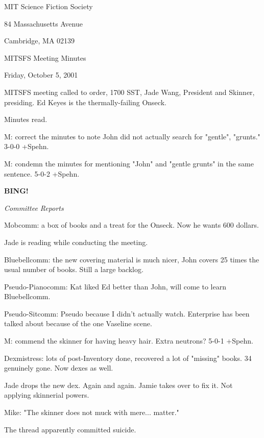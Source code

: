 \documentclass[12pt]{article}
\newcommand{\bing}{{\bf BING!} }
\newcommand{\goto}[1]{\bing \vskip 12pt \centerline{{\em{#1}}}}
\begin{document}
\begin{center}

MIT Science Fiction Society 

84 Massachusetts Avenue

Cambridge, MA 02139

\vspace{12pt}

MITSFS Meeting Minutes 

Friday, October 5, 2001

\end{center}
 
\vspace{18pt}

\setlength{\parskip}{6pt}

\noindent
MITSFS meeting called to order, 1700 SST, Jade Wang, President and
Skinner, presiding.  Ed Keyes is the thermally-failing Onseck.

Minutes read.

M: correct the minutes to note John did not actually search for "gentle", "grunts." 3-0-0 +Spehn.

M: condemn the minutes for mentioning "John" and "gentle grunts" in the same sentence. 5-0-2 +Spehn.

\goto{Committee Reports}

Mobcomm: a box of books and a treat for the Onseck. Now he wants 600 dollars.

Jade is reading while conducting the meeting.

Bluebellcomm: the new covering material is much nicer, John covers 25 times the usual number of books. Still a large backlog.

Pseudo-Pianocomm: Kat liked Ed better than John, will come to learn Bluebellcomm.

Pseudo-Sitcomm: Pseudo because I didn't actually watch. Enterprise has been talked about because of the one Vaseline scene.

M: commend the skinner for having heavy hair. Extra neutrons? 5-0-1 +Spehn.

Dexmistress: lots of post-Inventory done, recovered a lot of "missing" books. 34 genuinely gone. Now dexes as well.

Jade drops the new dex. Again and again. Jamie takes over to fix it. Not applying skinnerial powers.

Mike: "The skinner does not muck with mere... matter."

The thread apparently committed suicide.
\end{document}
